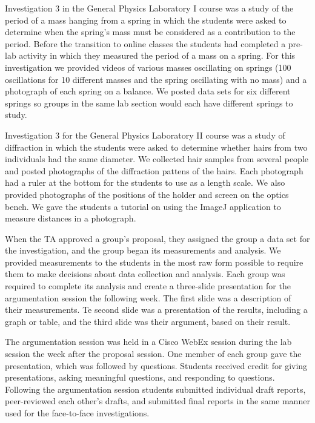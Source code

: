 \documentclass[aip, numerical, preprint]{revtex4-2}
\begin{document}
Investigation 3 in the General Physics Laboratory I course was a study of the period of a mass hanging from a spring in which the students were asked to determine when the spring's mass must be considered as a contribution to the period. Before the transition to online classes the students had completed a pre-lab activity in which they measured the period of a mass on a spring. For this investigation we provided videos of various masses oscillating on springs (100 oscillations for 10 different masses and the spring oscillating with no mass) and a photograph of each spring on a balance. We posted data sets for six different springs so groups in the same lab section would each have different springs to study. 

Investigation 3 for the General Physics Laboratory II course was a study of diffraction in which the students were asked to determine whether hairs from two individuals had the same diameter. We collected hair samples from several people and posted photographs of the diffraction pattens of the hairs. Each photograph had a ruler at the bottom for the students to use as a length scale. We also provided photographs of the positions of the holder and screen on the optics bench. We gave the students a tutorial on using the ImageJ application\citep{schrasetal12} to measure distances in a photograph.

When the TA approved a group's  proposal, they assigned the group a data set for the investigation, and the group began its measurements and analysis. We provided measurements to the students in the most raw form possible to require them to make decisions about data collection and analysis. Each group was required to complete its analysis and create a three-slide presentation for the argumentation session the following week. The first slide was a description of their measurements. Te second slide was a presentation of the results, including a graph or table, and the third slide was their argument, based on their result.

The argumentation session was held in a Cisco WebEx session during the lab session the week after the proposal session. One member of each group gave the presentation, which  was followed by questions. Students received credit for giving presentations, asking meaningful questions, and responding to questions.  Following the argumentation session students submitted individual draft reports, peer-reviewed each other's drafts, and submitted final reports in the same manner used for the face-to-face investigations.
\end{document}
